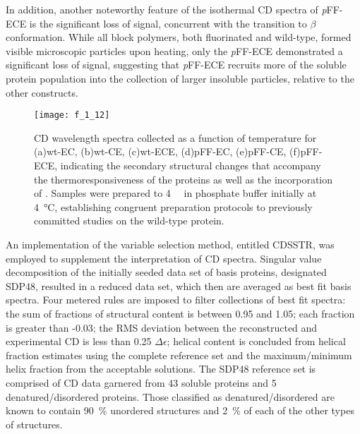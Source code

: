 \begin{refsection}
In addition, another noteworthy feature of the isothermal CD spectra
of \emph{p}FF-ECE is the significant loss of signal, concurrent with the
transition to ${\beta}$ conformation. While all block polymers, both fluorinated
and wild-type, formed visible microscopic particles upon heating, only the
\emph{p}FF-ECE demonstrated a significant loss of signal, suggesting that
\emph{p}FF-ECE recruits more of the soluble protein population into the
collection of larger insoluble particles, relative to the other constructs.
\begin{figure}[h!] \centering \texttt{[image: f\_1\_12]}
    \caption[CD wavelength spectra collected as a function of temperature for
    (a)wt-EC, (b)wt-CE, (c)wt-ECE, (d)pFF-EC, (e)pFF-CE, (f)pFF-ECE, indicating
the secondary structural changes that accompany the thermoresponsiveness of the
proteins as well as the incorporation of .
]{CD wavelength spectra collected as a function of temperature for
    (a)wt-EC, (b)wt-CE, (c)wt-ECE, (d)pFF-EC, (e)pFF-CE, (f)pFF-ECE, indicating
the secondary structural changes that accompany the thermoresponsiveness of the
proteins as well as the incorporation of .
Samples were prepared to \SI{4}{\micro\moLar} in phosphate buffer initially at
\SI{4}{\celsius}, establishing congruent preparation protocols to previously
committed studies on the wild-type protein.\cite{Haghpanah2009}} \label{fig:CD_temp_wl} \end{figure}

An implementation of the variable selection method,\cite{Manavalan1987} entitled
CDSSTR, was employed to supplement the interpretation of CD spectra. Singular
value decomposition of the initially seeded data set of basis proteins,
designated SDP48, resulted in a reduced data set, which then are averaged as
best fit basis spectra. Four metered rules are imposed to filter collections of
best fit spectra: the sum of fractions of structural content is between 0.95 and
1.05; each fraction is greater than -0.03; the RMS deviation between the
reconstructed and experimental CD is less than 0.25 ${\Delta\epsilon}$; helical
content is concluded from helical fraction estimates using the complete
reference set and the maximum/minimum helix fraction from the acceptable
solutions. The SDP48 reference set is comprised of CD data garnered from 43
soluble proteins and 5 denatured/disordered proteins. Those classified as
denatured/disordered are known to contain \SI{90}{\percent} unordered structures
and \SI{2}{\percent} of each of the other types of
structures.\cite{Sreerama2000b}


\end{refsection}
